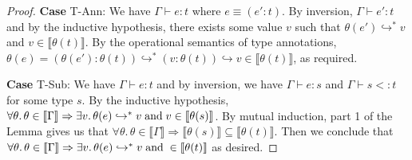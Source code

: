 \documentclass[11pt]{article}
\newcommand{\col}{\mathbin{:}}       %
\newcommand{\lb}{\llbracket}         %
\newcommand{\rb}{\rrbracket}         %
\newcommand{\step}{\hookrightarrow}
\newcommand{\many}{\hookrightarrow^*}
\newcommand{\foralltheta}{\forall\theta.\,\theta\in\lb\Gamma\rb}
\begin{document}
\begin{proof}
{\bf Case} {\sc T-Ann}: We have $\Gamma \vdash e : t$ where $e \equiv (e'\col t)$. By inversion, $\Gamma \vdash e' : t$ and by the inductive hypothesis, there exists some value $v$ such that $\theta(e') \many v$ and $v \in \lb\theta(t)\rb$. 
By the operational semantics of type annotations, $\theta(e) = (\theta(e')\col \theta(t)) \many (v\col \theta(t)) \step v \in \lb\theta(t)\rb$, as required. 

{\bf Case} {\sc T-Sub}: We have $\Gamma \vdash e : t $ and by inversion, we have $\Gamma \vdash e : s$ and $\Gamma \vdash s <: t$ for some type $s$. By the inductive hypothesis, 
$\foralltheta \Rightarrow \exists v.\, \theta(e) \many v \;{\rm and}\; v\in \lb\theta(s)\rb$. By mutual induction, part 1 of the Lemma gives us that $\foralltheta \Rightarrow \lb\theta(s)\rb \subseteq \lb\theta(t)\rb$.
Then we conclude that $\foralltheta \Rightarrow \exists v.\, \theta(e) \many v \;{\rm and}\; \in \lb\theta(t)\rb$ as desired.
\end{proof}
\end{document}
